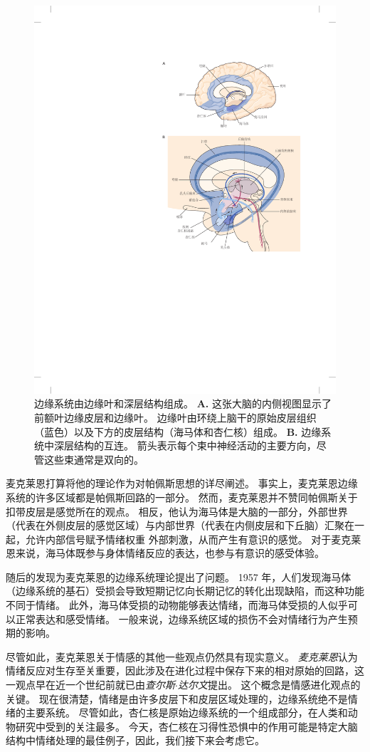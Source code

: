 \begin{figure}[htbp]
	\centering
	\includegraphics[width=0.75\linewidth]{chap42/fig_42_4}
	\caption{边缘系统由边缘叶和深层结构组成\cite{nieuwenhuys2007human}。
		\textbf{A.} 这张大脑的内侧视图显示了前额叶边缘皮层和边缘叶。
		边缘叶由环绕上脑干的原始皮层组织（蓝色）以及下方的皮层结构（海马体和杏仁核）组成。
		\textbf{B.} 边缘系统中深层结构的互连。
		箭头表示每个束中神经活动的主要方向，尽管这些束通常是双向的。}
	\label{fig:42_4}
\end{figure}


麦克莱恩打算将他的理论作为对帕佩斯思想的详尽阐述。
事实上，麦克莱恩边缘系统的许多区域都是帕佩斯回路的一部分。
然而，麦克莱恩并不赞同帕佩斯关于扣带皮层是感觉所在的观点。
相反，他认为海马体是大脑的一部分，外部世界（代表在外侧皮层的感觉区域）与内部世界（代表在内侧皮层和下丘脑）汇聚在一起，允许内部信号赋予情绪权重 外部刺激，从而产生有意识的感觉。
对于麦克莱恩来说，海马体既参与身体情绪反应的表达，也参与有意识的感受体验。


随后的发现为麦克莱恩的边缘系统理论提出了问题。
1957 年，人们发现海马体（边缘系统的基石）受损会导致短期记忆向长期记忆的转化出现缺陷，而这种功能不同于情绪。
此外，海马体受损的动物能够表达情绪，而海马体受损的人似乎可以正常表达和感受情绪。
一般来说，边缘系统区域的损伤不会对情绪行为产生预期的影响。


尽管如此，麦克莱恩关于情感的其他一些观点仍然具有现实意义。
\textit{麦克莱恩}认为情绪反应对生存至关重要，因此涉及在进化过程中保存下来的相对原始的回路，这一观点早在近一个世纪前就已由\textit{查尔斯$\cdot$达尔文}提出。
这个概念是情感进化观点的关键。
现在很清楚，情绪是由许多皮层下和皮层区域处理的，边缘系统绝不是情绪的主要系统。
尽管如此，杏仁核是原始边缘系统的一个组成部分，在人类和动物研究中受到的关注最多。
今天，杏仁核在习得性恐惧中的作用可能是特定大脑结构中情绪处理的最佳例子，因此，我们接下来会考虑它。



